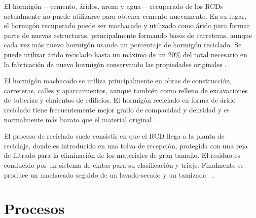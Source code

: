 El hormigón —cemento, áridos, arena y agua— recuperado de los RCDs actualmente no puede utilizarse para obtener cemento nuevamente. En su lugar, el hormigón recuperado puede ser machacado y utilizado como árido para formar parte de nuevas estructuras, principalmente formando bases de carreteras, aunque cada vez más nuevo hormigón usando un porcentaje de hormigón reciclado. Se puede utilizar árido reciclado hasta un máximo de un 20\% del total necesario en la fabricación de nuevo hormigón conservando las propiedades originales \cite{europeanconcrete}.

El hormigón machacado se utiliza principalmente en obras de construcción, carreteras, calles y aparcamientos, aunque también como relleno de excavaciones de tuberías y cimientos de edificios. El hormigón reciclado en forma de árido reciclado tiene frecuentemente mejor grado de compacidad y densidad y es normalmente más barato que el material original \cite{jsjunnesson}.

El proceso de reciclado suele consistir en que el RCD llega a la planta de reciclaje, donde es introducido en una tolva de recepción, protegida con una reja de filtrado para la eliminación de los materiales de gran tamaño. El residuo es conducido por un sistema de cintas para su clasificación y triaje. Finalmente se produce un machacado seguido de un lavado-secado y un tamizado \cite{monografia} \cite{gerd}.

\section{Procesos}





